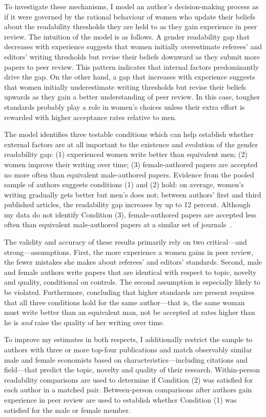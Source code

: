 To investigate these mechanisms, I model an author's decision-making process as if it were governed by the rational behaviour of women who update their beliefs about the readability thresholds they are held to as they gain experience in peer review. The intuition of the model is as follows. A gender readability gap that decreases with experience suggests that women initially overestimate referees' and editors' writing thresholds but revise their beliefs downward as they submit more papers to peer review. This pattern indicates that internal factors predominantly drive the gap. On the other hand, a gap that increases with experience suggests that women initially underestimate writing thresholds but revise their beliefs upwards as they gain a better understanding of peer review. In this case, tougher standards probably play a role in women's choices unless their extra effort is rewarded with higher acceptance rates relative to men.

The model identifies three testable conditions which can help establish whether external factors are at all important to the existence and evolution of the gender readability gap: (1) experienced women write better than equivalent men; (2) women improve their writing over time; (3) female-authored papers are accepted no more often than equivalent male-authored papers. Evidence from the pooled sample of authors suggests conditions (1) and (2) hold: on average, women's writing gradually gets better but men's does not; between authors' first and third published articles, the readability gap increases by up to 12 percent. Although my data do not identify Condition (3), female-authored papers are accepted less often than equivalent male-authored papers at a similar set of journals~\citep{Card2020}.

The validity and accuracy of these results primarily rely on two critical---and strong---assumptions. First, the more experience a women gains in peer review, the fewer mistakes she makes about referees' and editors' standards. Second, male and female authors write papers that are identical with respect to topic, novelty and quality, conditional on controls. The second assumption is especially likely to be violated. Furthermore, concluding that higher standards are present requires that all three conditions hold for the same author---that is, the same woman must write better than an equivalent man, not be accepted at rates higher than he is \emph{and} raise the quality of her writing over time.

To improve my estimates in both respects, I additionally restrict the sample to authors with three or more top-four publications and match observably similar male and female economists based on characteristics---including citations and field---that predict the topic, novelty and quality of their research. Within-person readability comparisons are used to determine if Condition (2) was satisfied for each author in a matched pair. Between-person comparisons after authors gain experience in peer review are used to establish whether Condition (1) was satisfied for the male or female member.

